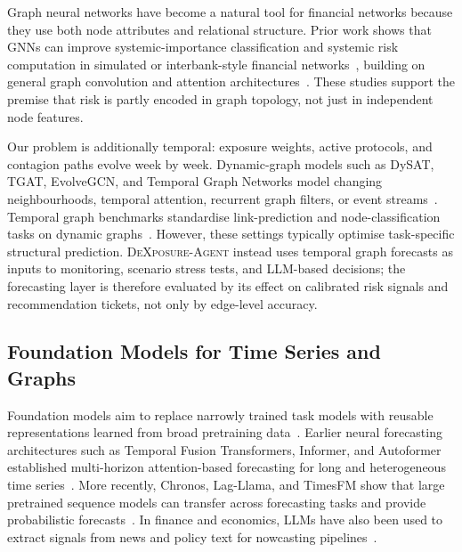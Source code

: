Graph neural networks have become a natural tool for financial networks
because they use both node attributes and relational structure. Prior work
shows that GNNs can improve systemic-importance classification and systemic
risk computation in simulated or interbank-style financial
networks~\cite{BALMASEDA2023200240,gonon2025computingsystemicriskmeasures},
building on general graph convolution and attention
architectures~\cite{KipfWelling2017,veličković2018graphattentionnetworks}.
These studies support the premise that risk is partly encoded in graph
topology, not just in independent node features.

Our problem is additionally temporal: exposure weights, active protocols, and
contagion paths evolve week by week. Dynamic-graph models such as DySAT,
TGAT, EvolveGCN, and Temporal Graph Networks model changing neighbourhoods,
temporal attention, recurrent graph filters, or event streams~\cite{
SankarEtAl2020DySAT,XuEtAl2020TGAT,ParejaEtAl2020EvolveGCN,
rossi2020temporalgraphnetworksdeep}. Temporal graph benchmarks standardise
link-prediction and node-classification tasks on dynamic
graphs~\cite{huang2023tgb}. However, these settings typically optimise
task-specific structural prediction. \textsc{DeXposure-Agent} instead uses
temporal graph forecasts as inputs to monitoring, scenario stress tests, and
LLM-based decisions; the forecasting layer is therefore evaluated by its
effect on calibrated risk signals and recommendation tickets, not only by
edge-level accuracy.

\subsection{Foundation Models for Time Series and Graphs}

Foundation models aim to replace narrowly trained task models with reusable
representations learned from broad pretraining data~\cite{
BommasaniEtAl2021FoundationModels}. Earlier neural forecasting architectures
such as Temporal Fusion Transformers, Informer, and Autoformer established
multi-horizon attention-based forecasting for long and heterogeneous time
series~\cite{LimEtAl2021TFT,ZhouEtAl2021Informer,WuEtAl2021Autoformer}. More
recently, Chronos, Lag-Llama, and TimesFM show that large pretrained sequence
models can transfer across forecasting tasks and provide probabilistic
forecasts~\cite{AnsariEtAl2024Chronos,RasulEtAl2023LagLlama,
DasEtAl2024TimesFM}. In finance and economics, LLMs have also been used to
extract signals from news and policy text for nowcasting pipelines~\cite{
deBondtSun2025ChatGPTNowcast,KwonEtAl2024BISLLMprimer,CarrieroEtAl2024MacroLLM}.

